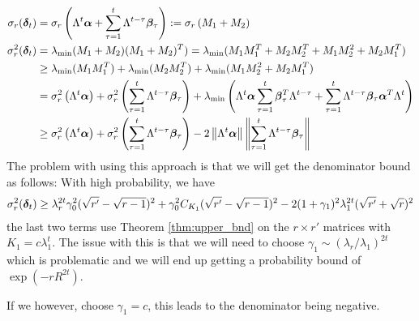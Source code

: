 \documentclass[10pt]{article}
\newcommand{\norm}[1]{\left\|#1\right\|}
\begin{document}
\begin{align*}
\sigma_r(\utcos_t) &= \sigma_r\left(\Lambda^t \ucos + \sum_{\tau=1}^t \Lambda^{t-\tau} \wcos_\tau\right) := \sigma_r\left(M_1 + M_2\right) \\
\sigma_r^2 (\utcos_t)&= \lambda_{\min}(M_1 + M_2)(M_1 + M_2)^T) = \lambda_{\min}(M_1 M_1^T + M_2 M_2^T + M_1 M_2^2 + M_2 M_1^T) \\
&\geq \lambda_{\min}(M_1 M_1^T)  + \lambda_{\min}(M_2 M_2^T) + \lambda_{\min}(M_1 M_2^2 + M_2 M_1^T) \\
& = \sigma_r^2\left( \Lambda^t \ucos \right) + \sigma_r^2\left( \sum_{\tau=1}^t \Lambda^{t-\tau} \wcos_\tau \right) + \lambda_{\min} \left( \Lambda^t \ucos \sum_{\tau=1}^t \wcos_\tau^T \Lambda^{t-\tau} + \sum_{\tau=1}^t \Lambda^{t-\tau} \wcos_\tau \ucos^T \Lambda^t \right) \\
& \geq \sigma_r^2\left( \Lambda^t \ucos \right) + \sigma_r^2\left( \sum_{\tau=1}^t \Lambda^{t-\tau} \wcos_\tau \right) - 2 \norm{\Lambda^t \ucos}\norm{\sum_{\tau=1}^t \Lambda^{t-\tau} \wcos_\tau} 
\end{align*}
The problem with using this approach is that we will get the denominator bound as follows: With high probability, we have
\begin{align*}
\sigma_r^2(\bm{\delta}_t) \geq \lambda_r^{2t} \gamma_0^2 (\sqrt{r'} - \sqrt{r-1})^2 + \gamma_0^2 C_{K_1} (\sqrt{r'} - \sqrt{r-1})^2 - 2  (1+\gamma_1)^2 \lambda_1^{2t} (\sqrt{r'} + \sqrt{r})^2
\end{align*}
the last two terms use Theorem \ref{thm:upper_bnd} on the $r \times r'$ matrices with $K_1 = c \lambda_1^t$. The issue with this is that we will need to choose $\gamma_1 \sim (\lambda_r/\lambda_1)^{2t}$ which is problematic and we will end up getting a probability bound of $\exp(-r R^{2t})$.

If we however, choose $\gamma_1 = c$, this leads to the denominator being negative. 
\end{document}
